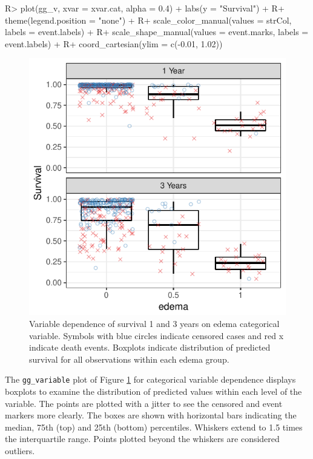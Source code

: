 \documentclass[article, nojss]{jss}
\begin{document}
\begin{Schunk}
\begin{Sinput}
R> plot(gg_v, xvar = xvar.cat, alpha = 0.4) + labs(y = "Survival") +
R+   theme(legend.position = "none") +
R+   scale_color_manual(values = strCol, labels = event.labels) +
R+   scale_shape_manual(values = event.marks, labels = event.labels) +
R+   coord_cartesian(ylim = c(-0.01, 1.02))
\end{Sinput}
\begin{figure}[!htb]

{\centering \includegraphics{rfs-variable-plotCat-1}

}

\caption[Variable dependence of survival 1 and 3 years on edema categorical variable]{Variable dependence of survival 1 and 3 years on edema categorical variable. Symbols with blue circles indicate censored cases and red x indicate death events. Boxplots indicate distribution of predicted survival for all observations within each edema group.}\label{fig:variable-plotCat}
\end{figure}
\end{Schunk}

The \texttt{gg\_variable} plot of Figure \ref{fig:variable-plotCat} for
categorical variable dependence displays boxplots to examine the
distribution of predicted values within each level of the variable. The
points are plotted with a jitter to see the censored and event markers
more clearly. The boxes are shown with horizontal bars indicating the
median, 75th (top) and 25th (bottom) percentiles. Whiskers extend to 1.5
times the interquartile range. Points plotted beyond the whiskers are
considered outliers.
\end{document}
